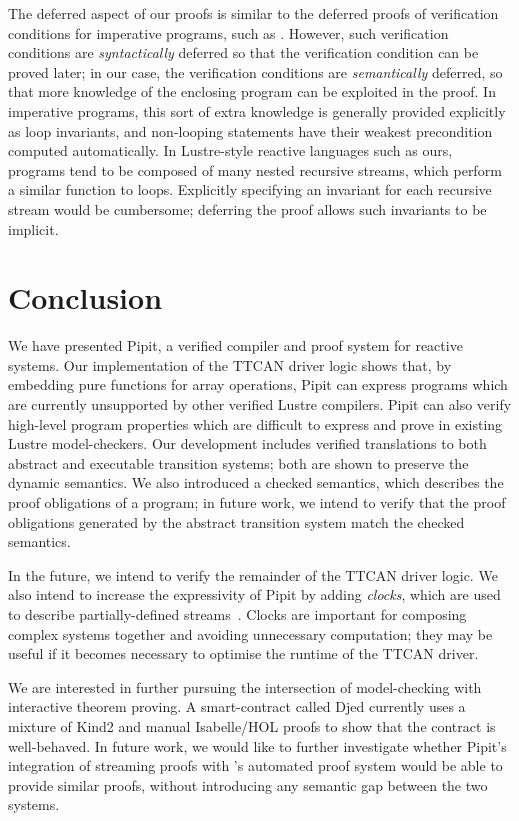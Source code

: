 \documentclass[a4paper,UKenglish,cleveref, autoref, thm-restate,anonymous]{lipics-v2021}
\begin{document}
The deferred aspect of our proofs is similar to the deferred proofs of verification conditions for imperative programs, such as \cite{oconnor2019deferring}.
However, such verification conditions are \emph{syntactically} deferred so that the verification condition can be proved later; in our case, the verification conditions are \emph{semantically} deferred, so that more knowledge of the enclosing program can be exploited in the proof.
In imperative programs, this sort of extra knowledge is generally provided explicitly as loop invariants, and non-looping statements have their weakest precondition computed automatically.
In Lustre-style reactive languages such as ours, programs tend to be composed of many nested recursive streams, which perform a similar function to loops.
Explicitly specifying an invariant for each recursive stream would be cumbersome; deferring the proof allows such invariants to be implicit.














 

\section{Conclusion}

We have presented Pipit, a verified compiler and proof system for reactive systems.
Our implementation of the TTCAN driver logic shows that, by embedding pure \fstar{} functions for array operations, Pipit can express programs which are currently unsupported by other verified Lustre compilers.
Pipit can also verify high-level program properties which are difficult to express and prove in existing Lustre model-checkers.
Our development includes verified translations to both abstract and executable transition systems; both are shown to preserve the dynamic semantics.
We also introduced a checked semantics, which describes the proof obligations of a program; in future work, we intend to verify that the proof obligations generated by the abstract transition system match the checked semantics.

In the future, we intend to verify the remainder of the TTCAN driver logic.
We also intend to increase the expressivity of Pipit by adding \emph{clocks}, which are used to describe partially-defined streams~\cite{caspi1995functional}.
Clocks are important for composing complex systems together and avoiding unnecessary computation; they may be useful if it becomes necessary to optimise the runtime of the TTCAN driver.

We are interested in further pursuing the intersection of model-checking with interactive theorem proving.
A smart-contract called Djed \cite{zahnentferner2023djed} currently uses a mixture of Kind2 \cite{champion2016kind2} and manual Isabelle/HOL proofs to show that the contract is well-behaved.
In future work, we would like to further investigate whether Pipit's integration of streaming proofs with \fstar{}'s automated proof system would be able to provide similar proofs, without introducing any semantic gap between the two systems.
 


\end{document}
